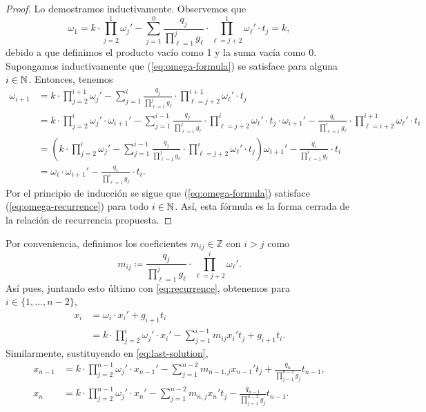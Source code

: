 \begin{proof}
	Lo demostramos inductivamente. Observemos que
	\begin{equation*}
		\omega_1 =
		k \cdot \prod_{j=2}^{1} \omega_j'
		- \sum_{j=1}^{0}\frac{q_j}{\prod_{\ell=1}^{j}g_\ell}
		\cdot \prod_{\ell=j+2}^{1}\omega_\ell' \cdot t_j
		= k,
	\end{equation*}
	debido a que definimos el producto vacío como 1 y la suma vacía como 0. Supongamos
	inductivamente que (\ref{eq:omega-formula}) se satisface para alguna $i \in \mathbb{N}$. Entonces,
	tenemos
	\begin{align*}
		\omega_{i + 1}
		&=
		k \cdot \prod_{j=2}^{i + 1} \omega_j'
		- \sum_{j=1}^{i}\frac{q_j}{\prod_{\ell=1}^{j}g_\ell}
		\cdot \prod_{\ell=j+2}^{i + 1}\omega_\ell' \cdot t_j \\
		&=
		k \cdot \prod_{j=2}^{i} \omega_j' \cdot \omega_{i+1}'
		- \sum_{j=1}^{i - 1}\frac{q_j}{\prod_{\ell=1}^{j}g_\ell}
		\cdot \prod_{\ell=j+2}^{i}\omega_\ell' \cdot t_j \cdot \omega_{i + 1}'
		- \frac{q_i}{\prod_{\ell = 1}^{i}g_\ell}
		\cdot \prod_{\ell = i + 2}^{i + 1}\omega_\ell' \cdot t_i \\
		&= 
		\left( k \cdot \prod_{j=2}^{i} \omega_j'
		- \sum_{j=1}^{i - 1}\frac{q_j}{\prod_{\ell=1}^{j}g_\ell}
		\cdot \prod_{\ell=j+2}^{i}\omega_\ell' \cdot t_j \right) \omega_{i+1}'
		- \frac{q_i}{\prod_{\ell = 1}^{i}g_\ell} \cdot t_i  \\
		&= \omega_i \cdot \omega_{i + 1}' - \frac{q_i}{\prod_{\ell = 1}^{i}g_\ell} \cdot t_i.
	\end{align*}
	Por el principio de inducción se sigue que (\ref{eq:omega-formula}) satisface
	(\ref{eq:omega-recurrence}) para todo $i \in \mathbb{N}$. Así, esta fórmula es la forma cerrada de la
	relación de recurrencia propuesta.
\end{proof}

Por conveniencia, definimos los coeficientes $m_{ij} \in \mathbb{Z}$ con $i > j$ como
\begin{equation}
	\label{phase-2:eq:coeffs}
	m_{ij} \coloneq \frac{q_j}{\prod_{\ell = 1}^{j}g_\ell} \cdot \prod_{\ell = j +
	2}^{i}\omega_\ell'.
\end{equation}
Así pues, juntando esto último con \ref{eq:recurrence}, obtenemos para $i \in \{1, \ldots, n -
2\}$, 
\begin{align}
	x_i &= \omega_i \cdot x_i' + g_{i + 1}t_i \nonumber \\
		&= k \cdot \prod_{j=2}^{i}\omega_j' \cdot x_i' - \sum_{j=1}^{i - 1}m_{ij}x_i'
		t_j + g_{i + 1}t_i \label{eq:x:i}.
\end{align}
Similarmente, sustituyendo en \ref{eq:last-solution},
\begin{subequations}
	\label{eq:x:last}
	\begin{align}
		x_{n-1} &= k \cdot \prod_{j=2}^{n-1} \omega_j' \cdot x_{n-1}' - \sum_{j=1}^{n-2}
		m_{n-1,j}x_{n-1}' t_j + \frac{q_n}{\prod_{j=1}^{n-2}g_j} t_{n-1}, \\
		x_{n} &= k \cdot \prod_{j=2}^{n-1} \omega_j' \cdot x_{n}' - \sum_{j=1}^{n-2}
		m_{n,j}x_{n}' t_j - \frac{q_{n - 1}}{\prod_{j=1}^{n-2}g_j} t_{n-1}.
	\end{align}
\end{subequations}

